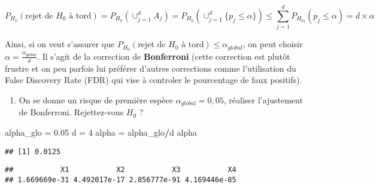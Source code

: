 \documentclass[
]{article}
\newenvironment{Shaded}{\begin{snugshade}}{\end{snugshade}}
\newcommand{\ControlFlowTok}[1]{\textcolor[rgb]{0.13,0.29,0.53}{\textbf{#1}}}
\newcommand{\DataTypeTok}[1]{\textcolor[rgb]{0.13,0.29,0.53}{#1}}
\newcommand{\DecValTok}[1]{\textcolor[rgb]{0.00,0.00,0.81}{#1}}
\newcommand{\FloatTok}[1]{\textcolor[rgb]{0.00,0.00,0.81}{#1}}
\newcommand{\KeywordTok}[1]{\textcolor[rgb]{0.13,0.29,0.53}{\textbf{#1}}}
\newcommand{\NormalTok}[1]{#1}
\newcommand{\OperatorTok}[1]{\textcolor[rgb]{0.81,0.36,0.00}{\textbf{#1}}}
\newcommand{\StringTok}[1]{\textcolor[rgb]{0.31,0.60,0.02}{#1}}
\providecommand{\tightlist}{%
  \setlength{\itemsep}{0pt}\setlength{\parskip}{0pt}}
\begin{document}
\[
P_{H_0}(\mbox{rejet de } H_0 \mbox{ à tord}) =  P_{H_0}(\cup_{j=1}^{d} A_j) = P_{H_0}(\cup_{j=1}^{d}\{p_j \leq \alpha\}) 
\leq \sum_{j = 1}^{d}P_{H_{0j}}\left(p_j \leq \alpha\right) = d \times \alpha
\]

Ainsi, si on veut s'assurer que
\(P_{H_0}(\mbox{rejet de } H_0 \mbox{ à tord}) \leq \alpha_{global}\),
on peut choisir \(\alpha = \frac{\alpha_{global}}{d}\). Il s'agit de la
correction de \textbf{Bonferroni} (cette correction est plutôt frustre
et on peu parfois lui préférer d'autres corrections comme l'utilisation
du False Discovery Rate (FDR) qui vise à controler le pourcentage de
faux positifs).

\begin{enumerate}
\def\labelenumi{\arabic{enumi}.}
\setcounter{enumi}{7}
\tightlist
\item
  On se donne un risque de première espèce \(\alpha_{global} = 0,05\),
  réaliser l'ajustement de Bonferroni. Rejettez-vous \(H_0\) ?
\end{enumerate}

\begin{Shaded}
\begin{Highlighting}[]
\NormalTok{alpha_glo =}\StringTok{ }\FloatTok{0.05}
\NormalTok{d =}\StringTok{ }\DecValTok{4}
\NormalTok{alpha =}\StringTok{ }\NormalTok{alpha_glo}\OperatorTok{/}\NormalTok{d}
\NormalTok{alpha}
\end{Highlighting}
\end{Shaded}

\begin{verbatim}
## [1] 0.0125
\end{verbatim}

\begin{Shaded}
\end{Shaded}

\begin{verbatim}
##           X1           X2           X3           X4 
## 1.669669e-31 4.492017e-17 2.856777e-91 4.169446e-85
\end{verbatim}
\end{document}
